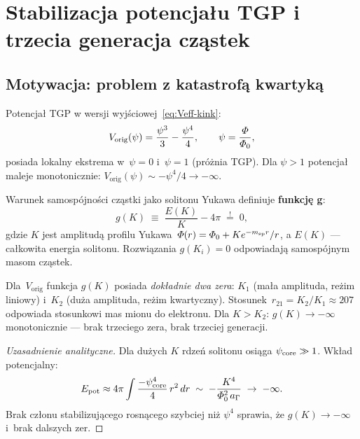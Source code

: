\section{Stabilizacja potencjału TGP i trzecia generacja cząstek}%
\label{app:v2-potencjal}

\subsection{Motywacja: problem z katastrofą kwartyką}%
\label{app:I-motywacja}

Potencjał TGP w wersji wyjściowej~\eqref{eq:Veff-kink}:
\begin{equation}\label{eq:V-orig}
    V_{\mathrm{orig}}(\psi)
    = \frac{\psi^3}{3} - \frac{\psi^4}{4},
    \qquad \psi = \frac{\varPhi}{\varPhi_0},
\end{equation}
posiada lokalny ekstrema w~$\psi = 0$ i~$\psi = 1$ (próżnia TGP).
Dla $\psi > 1$ potencjał maleje monotonicznie:
$V_{\mathrm{orig}}(\psi) \sim -\psi^4/4 \to -\infty$.

Warunek samospójności cząstki jako solitonu Yukawa definiuje
\textbf{funkcję g}:
\begin{equation}\label{eq:g-def}
    g(K) \;\equiv\; \frac{E(K)}{K} - 4\pi \;\stackrel{!}{=}\; 0,
\end{equation}
gdzie $K$ jest amplitudą profilu Yukawa~$\varPhi(r) = \varPhi_0 + K e^{-m_{\rm sp}r}/r$,
a $E(K)$ — całkowita energia solitonu. Rozwiązania $g(K_i) = 0$
odpowiadają samospójnym masom cząstek.

\begin{proposition}%
\label{prop:dwa-zera}
Dla~$V_{\mathrm{orig}}$ funkcja $g(K)$ posiada \emph{dokładnie dwa zera}:
$K_1$ (mała amplituda, reżim liniowy) i~$K_2$ (duża amplituda, reżim
kwartyczny). Stosunek~$r_{21} = K_2/K_1 \approx 207$
odpowiada stosunkowi mas mionu do elektronu.
Dla $K > K_2$: $g(K) \to -\infty$ monotonicznie —
brak trzeciego zera, brak trzeciej generacji.
\end{proposition}

\begin{proof}[Uzasadnienie analityczne]
Dla dużych $K$ rdzeń solitonu osiąga $\psi_{\rm core} \gg 1$.
Wkład potencjalny:
\[
    E_{\rm pot} \approx 4\pi \int \frac{-\psi_{\rm core}^4}{4}\, r^2\, dr
    \;\sim\; -\frac{K^4}{\varPhi_0^2\, a_\Gamma} \;\to\; -\infty.
\]
Brak członu stabilizującego rosnącego szybciej niż $\psi^4$
sprawia, że $g(K) \to -\infty$ i~brak dalszych zer.
\end{proof}


